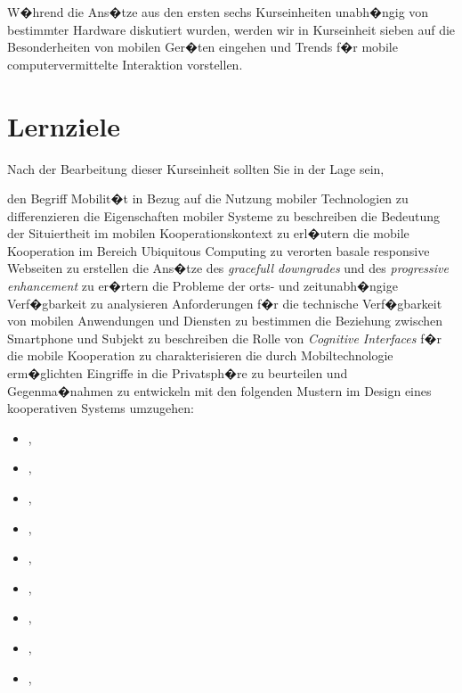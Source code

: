 \ifsplit
	\subtitle{Kurseinheit 7}
	\setcounter{chapter}{6}
	\setcounter{page}{208}
	\TitelBlatt{} 
	\tableofcontents
	\thispagestyle{empty}
\fi
{}\label{Mobile}

W�hrend die Ans�tze aus den ersten sechs Kurseinheiten unabh�ngig von bestimmter Hardware diskutiert wurden, werden wir in Kurseinheit sieben auf die Besonderheiten von mobilen Ger�ten eingehen und Trends f�r mobile computervermittelte Interaktion vorstellen.  
\minitoc


\section*{Lernziele}
Nach der Bearbeitung dieser Kurseinheit sollten Sie in der Lage
sein,

\begin{itemize}
\itemb den Begriff Mobilit�t in Bezug auf die Nutzung mobiler Technologien zu differenzieren
\itemb die Eigenschaften mobiler Systeme zu beschreiben
\itemb die Bedeutung der Situiertheit im mobilen Kooperationskontext zu erl�utern
\itemb die mobile Kooperation im Bereich Ubiquitous Computing zu verorten
\itemb basale responsive Webseiten zu erstellen 
\itemb die Ans�tze des \textit{gracefull downgrades} und des \textit{progressive enhancement} zu er�rtern
\itemb die Probleme der orts- und zeitunabh�ngige Verf�gbarkeit zu analysieren
\itemb Anforderungen f�r die technische Verf�gbarkeit von mobilen Anwendungen und Diensten zu bestimmen 
\itemb die Beziehung zwischen Smartphone und Subjekt zu beschreiben
\itemb die Rolle von \textit{Cognitive Interfaces} f�r die mobile Kooperation zu charakterisieren 
\itemb die durch Mobiltechnologie erm�glichten Eingriffe in die Privatsph�re zu beurteilen und Gegenma�nahmen zu entwickeln
\itemb mit den folgenden Mustern im Design eines kooperativen Systems umzugehen:
\begin{itemize}
\item {},
\item {},
\item {},
\item {},
\item {},
\item {},
\item {},
\item {},
\item {},
\end{itemize}
\end{itemize}





